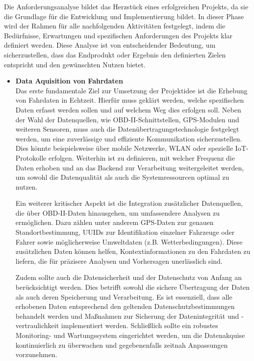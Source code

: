 \documentclass[oneside]{ausarbeitung}
\begin{document}
Die Anforderungsanalyse bildet das Herzstück eines erfolgreichen Projekts, da sie die Grundlage für die Entwicklung und 
Implementierung bildet. In dieser Phase wird der Rahmen für alle nachfolgenden Aktivitäten festgelegt, indem die Bedürfnisse,
Erwartungen und spezifischen Anforderungen des Projekts klar definiert werden. Diese Analyse ist von entscheidender Bedeutung, 
um sicherzustellen, dass das Endprodukt oder Ergebnis den definierten Zielen entspricht und den gewünschten Nutzen bietet.

\begin{itemize}
  \item \textbf{Data Aquisition von Fahrdaten}\\ Das erste fundamentale Ziel zur Umsetzung der Projektidee ist die Erhebung von 
  Fahrdaten in Echtzeit. Hierfür muss geklärt werden, welche spezifischen Daten erfasst werden sollen und auf welchem Weg dies 
  erfolgen soll. Neben der Wahl der Datenquellen, wie OBD-II-Schnittstellen, GPS-Modulen und weiteren Sensoren, muss auch die 
  Datenübertragungstechnologie festgelegt werden, um eine zuverlässige und effiziente Kommunikation sicherzustellen. Dies könnte 
  beispielsweise über mobile Netzwerke, WLAN oder spezielle IoT-Protokolle erfolgen. Weiterhin ist zu definieren, mit welcher 
  Frequenz die Daten erhoben und an das Backend zur Verarbeitung weitergeleitet werden, um sowohl die Datenqualität als auch die
  Systemressourcen optimal zu nutzen.
  
  Ein weiterer kritischer Aspekt ist die Integration zusätzlicher Datenquellen, die über OBD-II-Daten hinausgehen, um umfassendere
  Analysen zu ermöglichen. Dazu zählen unter anderem GPS-Daten zur genauen Standortbestimmung, UUIDs zur Identifikation einzelner 
  Fahrzeuge oder Fahrer sowie möglicherweise Umweltdaten (z.B. Wetterbedingungen). Diese zusätzlichen Daten können helfen, 
  Kontextinformationen zu den Fahrdaten zu liefern, die für präzisere Analysen und Vorhersagen unerlässlich sind.
  
  Zudem sollte auch die Datensicherheit und der Datenschutz von Anfang an berücksichtigt werden. Dies betrifft sowohl die sichere 
  Übertragung der Daten als auch deren Speicherung und Verarbeitung. Es ist essenziell, dass alle erhobenen Daten entsprechend den 
  geltenden Datenschutzbestimmungen behandelt werden und Maßnahmen zur Sicherung der Datenintegrität und -vertraulichkeit implementiert 
  werden. Schließlich sollte ein robustes Monitoring- und Wartungssystem eingerichtet werden, um die Datenakquise kontinuierlich zu überwachen und gegebenenfalls zeitnah Anpassungen vorzunehmen.
  

\end{itemize}
\end{document}
